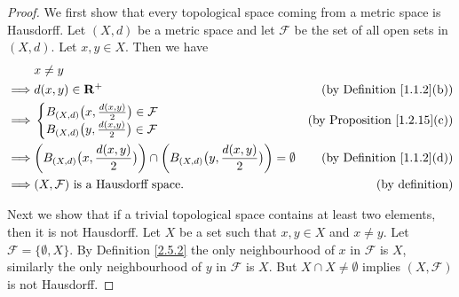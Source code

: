 \begin{proof}
    We first show that every topological space coming from a metric space is Hausdorff.
    Let \((X, d)\) be a metric space and let \(\mathcal{F}\) be the set of all open sets in \((X, d)\).
    Let \(x, y \in X\).
    Then we have
    \begin{align*}
                 & x \neq y                                                                                                                                                           \\
        \implies & d(x, y) \in \mathbf{R}^+                                                                                                           & \text{(by Definition \ref{1.1.2}(b))} \\
        \implies & \begin{cases}
                       B_{(X, d)}\big(x, \frac{d(x, y)}{2}\big) \in \mathcal{F} \\
                       B_{(X, d)}\big(y, \frac{d(x, y)}{2}\big) \in \mathcal{F}
                   \end{cases}                                                          & \text{(by Proposition \ref{1.2.15}(c))}                                                     \\
        \implies & \bigg(B_{(X, d)}\big(x, \frac{d(x, y)}{2}\big)\bigg) \cap \bigg(B_{(X, d)}\big(y, \frac{d(x, y)}{2}\big)\bigg) = \emptyset & \text{(by Definition \ref{1.1.2}(d))} \\
        \implies & (X, \mathcal{F}) \text{ is a Hausdorff space}.                                                                             & \text{(by definition)}
    \end{align*}

    Next we show that if a trivial topological space contains at least two elements, then it is not Hausdorff.
    Let \(X\) be a set such that \(x, y \in X\) and \(x \neq y\).
    Let \(\mathcal{F} = \{\emptyset, X\}\).
    By Definition \ref{2.5.2} the only neighbourhood of \(x\) in \(\mathcal{F}\) is \(X\), similarly the only neighbourhood of \(y\) in \(\mathcal{F}\) is \(X\).
    But \(X \cap X \neq \emptyset\) implies \((X, \mathcal{F})\) is not Hausdorff.


\end{proof}
